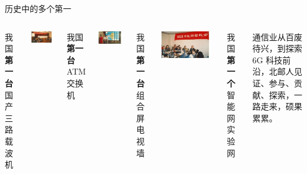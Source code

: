 \documentclass[aspectratio=169, utf8]{beamer}
\begin{document}
\begin{frame}{历史中的多个第一}
\begin{columns}
        我国\textcolor{Fore}{\textbf{第一台}}国产三路载波机

        \vspace{2.3em}

        \includegraphics[width=0.9\textwidth]{./resources/6.jpg}

        我国\textcolor{Fore}{\textbf{第一台}} ATM 交换机

        \centering
        \scriptsize
        \includegraphics[width=0.9\textwidth]{./resources/7.jpg}

        我国\textcolor{Fore}{\textbf{第一台}}组合屏电视墙

        \vspace{2.3em}

        \includegraphics[width=0.9\textwidth]{./resources/8.jpg}

        我国\textcolor{Fore}{\textbf{第一个}}智能网实验网

        \setlength{\parindent}{2em}

        通信业从百废待兴，到探索 6G 科技前沿，北邮人见证、参与、贡献、探索，一路走来，硕果累累。

    \end{columns}
\end{frame}
\end{document}
